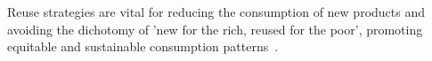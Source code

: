 Reuse strategies are vital for reducing the consumption of new products and avoiding the dichotomy of 'new for the rich, reused for the poor', promoting equitable and sustainable consumption patterns~\cite{morseletto2020cetargets}.

















